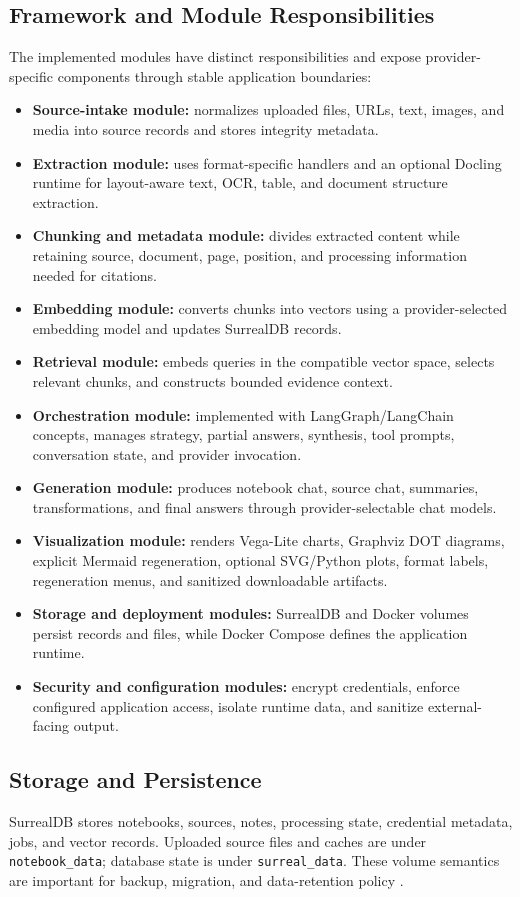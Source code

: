 \documentclass[conference]{IEEEtran}
\begin{document}
\subsection{Framework and Module Responsibilities}
The implemented modules have distinct responsibilities and expose provider-specific components through stable application boundaries:
\begin{itemize}
 \item \textbf{Source-intake module:} normalizes uploaded files, URLs, text, images, and media into source records and stores integrity metadata.
 \item \textbf{Extraction module:} uses format-specific handlers and an optional Docling runtime for layout-aware text, OCR, table, and document structure extraction.
 \item \textbf{Chunking and metadata module:} divides extracted content while retaining source, document, page, position, and processing information needed for citations.
 \item \textbf{Embedding module:} converts chunks into vectors using a provider-selected embedding model and updates SurrealDB records.
 \item \textbf{Retrieval module:} embeds queries in the compatible vector space, selects relevant chunks, and constructs bounded evidence context.
 \item \textbf{Orchestration module:} implemented with LangGraph/LangChain concepts, manages strategy, partial answers, synthesis, tool prompts, conversation state, and provider invocation.
 \item \textbf{Generation module:} produces notebook chat, source chat, summaries, transformations, and final answers through provider-selectable chat models.
 \item \textbf{Visualization module:} renders Vega-Lite charts, Graphviz DOT diagrams, explicit Mermaid regeneration, optional SVG/Python plots, format labels, regeneration menus, and sanitized downloadable artifacts.
 \item \textbf{Storage and deployment modules:} SurrealDB and Docker volumes persist records and files, while Docker Compose defines the application runtime.
 \item \textbf{Security and configuration modules:} encrypt credentials, enforce configured application access, isolate runtime data, and sanitize external-facing output.
\end{itemize}

\subsection{Storage and Persistence}
SurrealDB stores notebooks, sources, notes, processing state, credential metadata, jobs, and vector records. Uploaded source files and caches are under \texttt{notebook\_data}; database state is under \texttt{surreal\_data}. These volume semantics are important for backup, migration, and data-retention policy \cite{docintel,surrealdb}.
\end{document}

